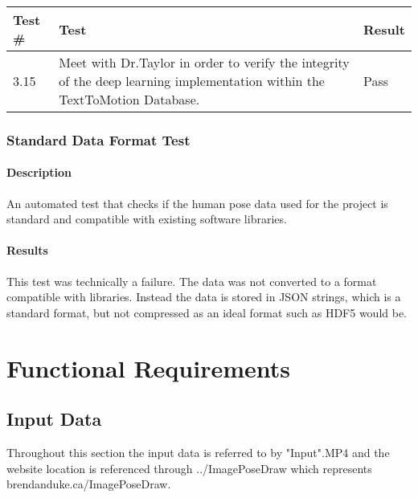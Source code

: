 \documentclass{scrreprt}
\begin{document}
\begin{table}[H]
        \centering
        \begin{tabular}{||p{0.75cm}|p{7.5cm}|p{0.75cm}||}
                \hline
                \textbf Test \# & \textbf Test & \textbf Result\\
                \hline\hline
                3.15 & Meet with Dr.Taylor in order to verify the integrity of the deep learning implementation within the TextToMotion Database. & Pass\\ %
                \hline
        \end{tabular}
\end{table}

\subsection{Standard Data Format Test}

\subsubsection{Description}

An automated test that checks if the human pose data used for the project is
standard and compatible with existing software libraries.

\subsubsection{Results}

This test was technically a failure. The data was not converted to a format
compatible with libraries. Instead the data is stored in JSON strings, which is
a standard format, but not compressed as an ideal format such as HDF5 would be.


\chapter{Functional Requirements}

\section{Input Data}

Throughout this section the input data is referred to by "Input".MP4 and the website location is referenced through ../ImagePoseDraw which represents brendanduke.ca/ImagePoseDraw.
\end{document}
